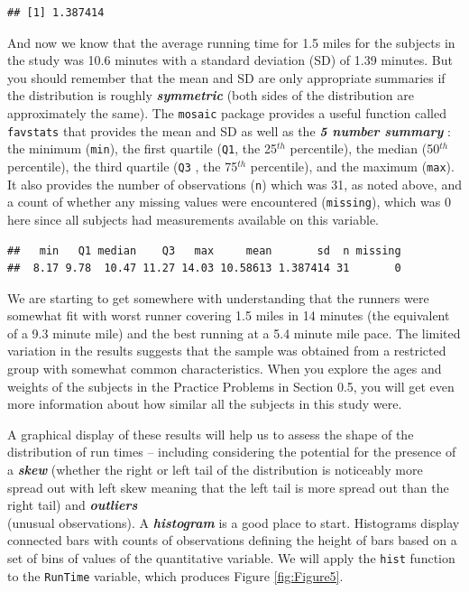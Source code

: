 \documentclass[]{book}
\newenvironment{Shaded}{\begin{snugshade}}{\end{snugshade}}
\newcommand{\KeywordTok}[1]{\textcolor[rgb]{0.13,0.29,0.53}{\textbf{#1}}}
\newcommand{\OperatorTok}[1]{\textcolor[rgb]{0.81,0.36,0.00}{\textbf{#1}}}
\newcommand{\NormalTok}[1]{#1}
\begin{document}
\begin{verbatim}
## [1] 1.387414
\end{verbatim}

And now we know that the average running time for 1.5 miles for the
subjects in the study was 10.6 minutes with a standard deviation (SD) of
1.39 minutes. But you should remember that the mean and SD are only
appropriate summaries if the distribution is roughly
\textbf{\emph{symmetric}} (both sides of the distribution are
approximately the same). The \texttt{mosaic} package provides a useful
function called \texttt{favstats} that provides the mean and SD as well
as the \textbf{\emph{5 number summary}} : the minimum (\texttt{min}),
the first quartile (\texttt{Q1}, the 25\(^{th}\) percentile), the median
(50\(^{th}\) percentile), the third quartile (\texttt{Q3} , the
75\(^{th}\) percentile), and the maximum (\texttt{max}). It also
provides the number of observations (\texttt{n}) which was 31, as noted
above, and a count of whether any missing values were encountered
(\texttt{missing}), which was 0 here since all subjects had measurements
available on this variable.

\begin{Shaded}
\end{Shaded}

\begin{verbatim}
##   min   Q1 median    Q3   max     mean       sd  n missing
##  8.17 9.78  10.47 11.27 14.03 10.58613 1.387414 31       0
\end{verbatim}

We are starting to get somewhere with understanding that the runners
were somewhat fit with worst runner covering 1.5 miles in 14 minutes
(the equivalent of a 9.3 minute mile) and the best running at a 5.4
minute mile pace. The limited variation in the results suggests that the
sample was obtained from a restricted group with somewhat common
characteristics. When you explore the ages and weights of the subjects
in the Practice Problems in Section 0.5, you will get even more
information about how similar all the subjects in this study were.

A graphical display of these results will help us to assess the shape of
the distribution of run times -- including considering the potential for
the presence of a \textbf{\emph{skew}} (whether the right or left tail
of the distribution is noticeably more spread out with left skew meaning
that the left tail is more spread out than the right tail) and
\textbf{\emph{outliers}}\\
(unusual observations). A \textbf{\emph{histogram }} is a good place to
start. Histograms display connected bars with counts of observations
defining the height of bars based on a set of bins of values of the
quantitative variable. We will apply the \texttt{hist} function to the
\texttt{RunTime} variable, which produces Figure \ref{fig:Figure5}.
\end{document}
